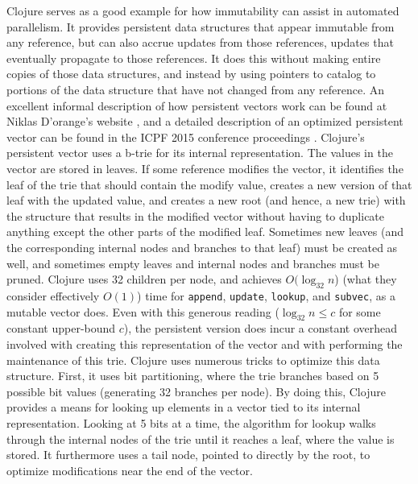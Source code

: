 Clojure serves as a good example for how immutability can assist in automated
parallelism. It provides persistent data structures that appear immutable from
any reference, but can also accrue updates from those references, updates that
eventually propagate to those references. It does this without making entire
copies of those data structures, and instead by using pointers to catalog to
portions of the data structure that have not changed from any reference. An
excellent informal description of how persistent vectors work can be found at
Niklas D'orange's website \cite{persvec1}, and a detailed description of an
optimized persistent vector can be found in the ICPF 2015 conference proceedings
\cite{rrb_vec}.  Clojure’s persistent vector uses a b-trie for its internal
representation. The values in the vector are stored in leaves. If some reference
modifies the vector, it identifies the leaf of the trie that should contain the
modify value, creates a new version of that leaf with the updated value, and
creates a new root (and hence, a new trie) with the structure that results in
the modified vector without having to duplicate anything except the other parts
of the modified leaf. Sometimes new leaves (and the corresponding internal nodes
and branches to that leaf) must be created as well, and sometimes empty leaves
and internal nodes and branches must be pruned.  Clojure uses 32 children per
node, and achieves $O(\log_{32} n$) (what they consider effectively $O(1)$)
time for \texttt{append}, \texttt{update}, \texttt{lookup}, and \texttt{subvec},
as a mutable vector does. Even with this generous reading ($\log_{32} n \leq c$
for some constant upper-bound $c$), the persistent version does incur a constant
overhead involved with creating this representation of the vector and with
performing the maintenance of this trie. Clojure uses numerous tricks to
optimize this data structure. First, it uses bit partitioning, where the trie
branches based on 5 possible bit values (generating 32 branches per node). By
doing this, Clojure provides a means for looking up elements in a vector tied to
its internal representation. Looking at 5 bits at a time, the algorithm for
lookup walks through the internal nodes of the trie until it reaches a leaf,
where the value is stored. It furthermore uses a tail node, pointed to directly
by the root, to optimize modifications near the end of the vector.

